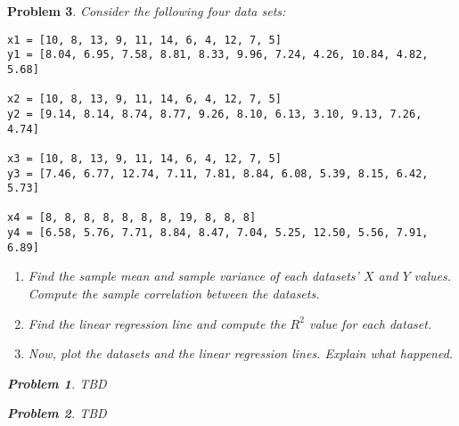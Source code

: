 \documentclass{article}
\newtheorem{problem}{Problem}
\begin{document}
\begin{problem}
Consider the following four data sets:

    \begin{lstlisting}
x1 = [10, 8, 13, 9, 11, 14, 6, 4, 12, 7, 5]
y1 = [8.04, 6.95, 7.58, 8.81, 8.33, 9.96, 7.24, 4.26, 10.84, 4.82, 5.68]

x2 = [10, 8, 13, 9, 11, 14, 6, 4, 12, 7, 5]
y2 = [9.14, 8.14, 8.74, 8.77, 9.26, 8.10, 6.13, 3.10, 9.13, 7.26, 4.74]

x3 = [10, 8, 13, 9, 11, 14, 6, 4, 12, 7, 5]
y3 = [7.46, 6.77, 12.74, 7.11, 7.81, 8.84, 6.08, 5.39, 8.15, 6.42, 5.73]

x4 = [8, 8, 8, 8, 8, 8, 8, 19, 8, 8, 8]
y4 = [6.58, 5.76, 7.71, 8.84, 8.47, 7.04, 5.25, 12.50, 5.56, 7.91, 6.89]

    \end{lstlisting}

\begin{enumerate}[label=(\alph*),topsep=0pt]
    \item Find the sample mean and sample variance of each datasets' $X$ and $Y$ values. Compute the sample correlation between the datasets.
    \item Find the linear regression line and compute the $R^2$ value for each dataset.
    \item Now, plot the datasets and the linear regression lines. Explain what happened.
\end{enumerate}


\begin{problem}
TBD
\end{problem}

\begin{problem}
TBD
\end{problem}


\end{problem}
\end{document}
